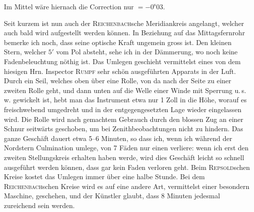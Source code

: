 Im Mittel wäre hiernach die Correction nur $= -0^{\mathrm s}03$.

\par\indent Seit kurzem ist nun auch der \textsc{Reichenbach}sche Meridiankreis angelangt, welcher auch bald wird aufgestellt werden können. In Beziehung auf das Mittagsfernrohr bemerke ich noch, dass seine optische Kraft ungemein gross ist. Den kleinen Stern, welcher $5'$ vom Pol absteht, sehe ich in der Dämmerung, wo noch keine Fadenbeleuchtung nöthig ist. Das Umlegen geschieht vermittelst eines von dem hiesigen Hrn. Inspector \textsc{Rumpf} sehr schön ausgeführten Apparats in der Luft. Durch ein Seil, welches oben über eine Rolle, von da nach der Seite zu einer zweiten Rolle geht, und dann unten auf die Welle einer Winde mit Sperrung u.\,s.\,w. gewickelt ist, hebt man das Instrument etwa nur 1 Zoll in die Höhe, worauf es freischwebend umgedreht und in der entgegengesetzten Lage wieder eingelassen wird. Die Rolle wird nach gemachtem Gebrauch durch den blossen Zug an einer Schnur seitwärts geschoben, um bei Zenithbeobachtungen nicht zu hindern. Das ganze Geschäft dauert etwa 5--6 Minuten, so dass ich, wenn ich während der Nordstern Culmination umlege, von 7 Fäden nur einen verliere: wenn ich erst den zweiten Stellungskreis erhalten haben werde, wird dies Geschäft leicht so schnell ausgeführt werden können, dass gar kein Faden verloren geht. Beim \textsc{Repsold}schen Kreise kostet das Umlegen immer über eine halbe Stunde. Bei dem \textsc{Reichenbach}schen Kreise wird es auf eine andere Art, vermittelst einer besondern Maschine, geschehen, und der Künstler glaubt, dass 8 Minuten jedesmal zureichend sein werden.
